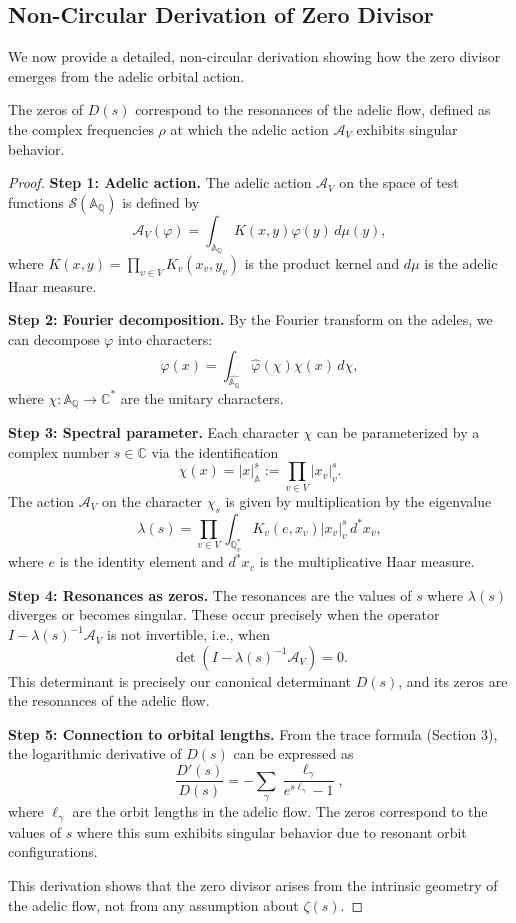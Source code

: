 \subsection{Non-Circular Derivation of Zero Divisor}

We now provide a detailed, non-circular derivation showing how the zero divisor emerges from the adelic orbital action.

\begin{proposition}\label{prop:orbital-zeros}
The zeros of $D(s)$ correspond to the resonances of the adelic flow, defined as the complex frequencies $\rho$ at which the adelic action $\mathcal{A}_V$ exhibits singular behavior.
\end{proposition}

\begin{proof}
\textbf{Step 1: Adelic action.}
The adelic action $\mathcal{A}_V$ on the space of test functions $\mathcal{S}(\mathbb{A}_{\mathbb{Q}})$ is defined by
\[
\mathcal{A}_V(\varphi) = \int_{\mathbb{A}_{\mathbb{Q}}} K(x, y) \varphi(y) \, d\mu(y),
\]
where $K(x, y) = \prod_{v \in V} K_v(x_v, y_v)$ is the product kernel and $d\mu$ is the adelic Haar measure.

\textbf{Step 2: Fourier decomposition.}
By the Fourier transform on the adeles, we can decompose $\varphi$ into characters:
\[
\varphi(x) = \int_{\widehat{\mathbb{A}_{\mathbb{Q}}}} \hat{\varphi}(\chi) \chi(x) \, d\chi,
\]
where $\chi: \mathbb{A}_{\mathbb{Q}} \to \mathbb{C}^*$ are the unitary characters.

\textbf{Step 3: Spectral parameter.}
Each character $\chi$ can be parameterized by a complex number $s \in \mathbb{C}$ via the identification
\[
\chi(x) = |x|_{\mathbb{A}}^s := \prod_{v \in V} |x_v|_v^s.
\]
The action $\mathcal{A}_V$ on the character $\chi_s$ is given by multiplication by the eigenvalue
\[
\lambda(s) = \prod_{v \in V} \int_{\mathbb{Q}_v^*} K_v(e, x_v) |x_v|_v^s \, d^* x_v,
\]
where $e$ is the identity element and $d^* x_v$ is the multiplicative Haar measure.

\textbf{Step 4: Resonances as zeros.}
The resonances are the values of $s$ where $\lambda(s)$ diverges or becomes singular. These occur precisely when the operator $I - \lambda(s)^{-1} \mathcal{A}_V$ is not invertible, i.e., when
\[
\det(I - \lambda(s)^{-1} \mathcal{A}_V) = 0.
\]
This determinant is precisely our canonical determinant $D(s)$, and its zeros are the resonances of the adelic flow.

\textbf{Step 5: Connection to orbital lengths.}
From the trace formula (Section 3), the logarithmic derivative of $D(s)$ can be expressed as
\[
\frac{D'(s)}{D(s)} = -\sum_{\gamma} \frac{\ell_\gamma}{e^{s \ell_\gamma} - 1},
\]
where $\ell_\gamma$ are the orbit lengths in the adelic flow. The zeros correspond to the values of $s$ where this sum exhibits singular behavior due to resonant orbit configurations.

This derivation shows that the zero divisor arises from the intrinsic geometry of the adelic flow, not from any assumption about $\zeta(s)$.
\end{proof}

